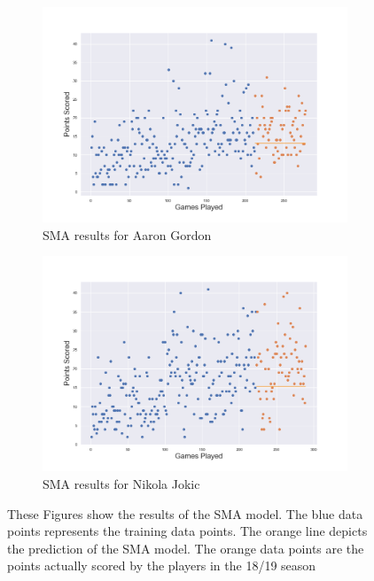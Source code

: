 \documentclass[a4paper,11pt,twoside]{article}
\begin{document}
\begin{figure}
\centering
  \begin{subfigure}[b]{0.65\textwidth}
    \includegraphics[width=\textwidth]{../players_sma/player3.png}
    \caption{SMA results for Aaron Gordon}
    \label{fig:1}
  \end{subfigure}
  \begin{subfigure}[b]{0.65\textwidth}
    \includegraphics[width=\textwidth]{../players_sma/player24.png}
    \caption{SMA results for Nikola Jokic}
    \label{fig:2}
  \end{subfigure}
  \caption{These Figures show the results of the SMA model. The blue data points represents the training data points. The orange line depicts the prediction of the SMA model. The orange data points are the points actually scored by the players in the 18/19 season}
\end{figure}
\end{document}
